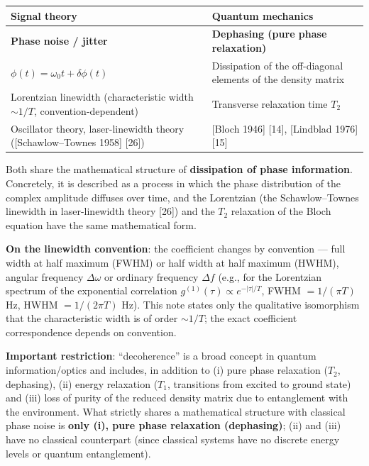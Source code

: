 \documentclass[
]{article}
\newcounter{none} %
\begin{document}
{\def\LTcaptype{none} %
\begin{longtable}[]{@{}
  >{\raggedright\arraybackslash}p{}
  >{\raggedright\arraybackslash}p{}@{}}
\toprule\noalign{}
\begin{minipage}[b]{\linewidth}\raggedright
Signal theory
\end{minipage} & \begin{minipage}[b]{\linewidth}\raggedright
Quantum mechanics
\end{minipage} \\
\midrule\noalign{}
\endhead
\bottomrule\noalign{}
\endlastfoot
\textbf{Phase noise / jitter} & \textbf{Dephasing (pure phase
relaxation)} \\
\(\phi(t) = \omega_0 t + \delta\phi(t)\) & Dissipation of the
off-diagonal elements of the density matrix \\
Lorentzian linewidth (characteristic width \(\sim 1/T\),
convention-dependent) & Transverse relaxation time \(T_2\) \\
Oscillator theory, laser-linewidth theory ({[}Schawlow--Townes 1958{]}
{[}26{]}) & {[}Bloch 1946{]} {[}14{]}, {[}Lindblad 1976{]} {[}15{]} \\
\end{longtable}
}

Both share the mathematical structure of \textbf{dissipation of phase
information}. Concretely, it is described as a process in which the
phase distribution of the complex amplitude diffuses over time, and the
Lorentzian (the Schawlow--Townes linewidth in laser-linewidth theory
{[}26{]}) and the \(T_2\) relaxation of the Bloch equation have the same
mathematical form.

\textbf{On the linewidth convention}: the coefficient changes by
convention --- full width at half maximum (FWHM) or half width at half
maximum (HWHM), angular frequency \(\Delta\omega\) or ordinary frequency
\(\Delta f\) (e.g., for the Lorentzian spectrum of the exponential
correlation \(g^{(1)}(\tau)\propto e^{-|\tau|/T}\), FWHM \(=1/(\pi T)\)
Hz, HWHM \(=1/(2\pi T)\) Hz). This note states only the qualitative
isomorphism that the characteristic width is of order \(\sim 1/T\); the
exact coefficient correspondence depends on convention.

\textbf{Important restriction}: ``decoherence'' is a broad concept in
quantum information/optics and includes, in addition to (i) pure phase
relaxation (\(T_2\), dephasing), (ii) energy relaxation (\(T_1\),
transitions from excited to ground state) and (iii) loss of purity of
the reduced density matrix due to entanglement with the environment.
What strictly shares a mathematical structure with classical phase noise
is \textbf{only (i), pure phase relaxation (dephasing)}; (ii) and (iii)
have no classical counterpart (since classical systems have no discrete
energy levels or quantum entanglement).
\end{document}
